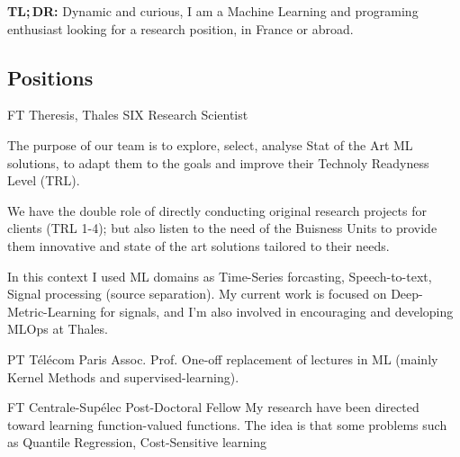 \documentclass[10pt]{article} %
\begin{document}
\begin{center}
    \textbf{TL;\,DR:} Dynamic and curious, I am a Machine Learning and
    programing enthusiast looking for a research position, in France or abroad.
\end{center}
\medskip
\begin{paracol}{2}
%
%
\section{Positions}
%
%
%
%
%
{FT} %
{Theresis, Thales SIX} %
{Research Scientist} %
{The purpose of our team is to explore, select, analyse Stat of the Art
  ML solutions, to adapt them to the goals and improve their Technoly
  Readyness Level (TRL). \par
  We have the double role of directly conducting original research
  projects for clients (TRL 1-4); but also listen to the need of the
  Buisness Units to provide them innovative and state of the art
  solutions tailored to their needs.  \par
  In this context I used ML domains as Time-Series forcasting,
  Speech-to-text, Signal processing (source separation). My current work
  is focused on Deep-Metric-Learning for signals, and I'm also involved in
  encouraging and developing MLOps at Thales.}\par %
{PT} %
{T\'el\'ecom Paris} %
{Assoc. Prof.} %
{One-off replacement of lectures in ML (mainly Kernel Methods and
  supervised-learning).}\par
{} %
{FT} %
{Centrale-Sup\'elec} %
{Post-Doctoral Fellow} %
{My research have been directed toward learning function-valued functions. The
idea is that some problems such as Quantile Regression, Cost-Sensitive learning
}
\end{paracol}
\end{document}
